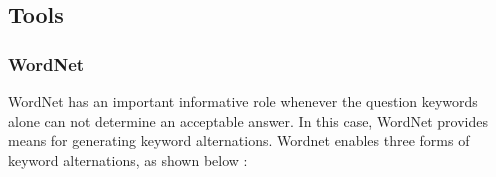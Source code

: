 \documentclass[12pt, a4paper]{report}
\begin{document}



\subsection{Tools}
\subsubsection{WordNet}
WordNet has an important informative role whenever the question keywords alone can not determine an acceptable answer. In this case, WordNet provides means for generating keyword alternations. Wordnet enables three forms of keyword alternations, as shown below \cite{2}:
\end{document}
